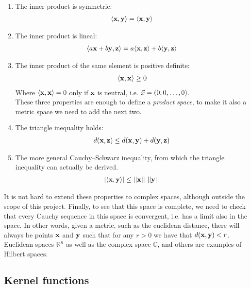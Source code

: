 \begin{enumerate}
    \item The inner product is symmetric:
    \begin{align*}
        \langle\mathbf{x}, \mathbf{y}\rangle = \langle\mathbf{x}, \mathbf{y}\rangle
    \end{align*}
    \item The inner product is lineal:
    \begin{align*}
        \langle a\mathbf{x} + b\mathbf{y}, \mathbf{z}\rangle = a\langle\mathbf{x}, \mathbf{z}\rangle + b\langle\mathbf{y}, \mathbf{z}\rangle 
    \end{align*}
    \item The inner product of the same element is positive definite:
    \begin{align*}
        \langle\mathbf{x}, \mathbf{x}\rangle \ge 0
    \end{align*}
    Where $\langle\mathbf{x}, \mathbf{x}\rangle = 0$ only if $\mathbf{x}$ is neutral, i.e. $\vec{x} = (0,0,\dots, 0)$. \\
    These three properties are enough to define a \emph{product space}, to make it also a metric space we need to add the next two.
    \item The triangle inequality holds:
    \begin{align*}
        d(\mathbf{x}, \mathbf{z}) \le d(\mathbf{x}, \mathbf{y}) + d(\mathbf{y}, \mathbf{z}) 
    \end{align*}
    \item The more general Cauchy–Schwarz inequality, from which the triangle in\-equal\-i\-ty can actually be derived.
    \begin{align*}
        |\langle\mathbf{x}, \mathbf{y}\rangle| \le ||\mathbf{x}||\ ||\mathbf{y}|| 
    \end{align*}
\end{enumerate}

It is not hard to extend these properties to complex spaces, although outside the scope of this project. Finally, to see that this space is complete, we need to check that every Cauchy sequence in this space is convergent, i.e. has a limit also in the space. In other words, given a metric, such as the euclidean distance, there will always be points $\mathbf{x}$ and $\mathbf{y}$ such that for any $r > 0$ we have that $d(\mathbf{x}, \mathbf{y}) < r$. Euclidean spaces $\mathbb{R}^n$ as well as the complex space $\mathbb{C}$, and others are examples of Hilbert spaces.

\subsection{Kernel functions}

